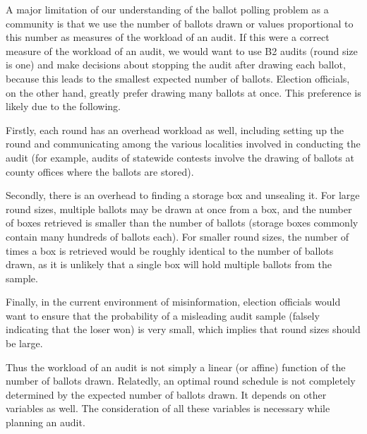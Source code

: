 A major limitation of our understanding of the ballot polling problem as a community is that we use the number of ballots drawn or values proportional to this number \cite{mclaughlin_thesis,bernhard-diss,RI-report} as measures of the workload of an audit. If this were a correct measure of the workload of an audit, we would want to use B2 audits (round size is one) and make decisions about stopping the audit after drawing each ballot, because this leads to the smallest expected number of ballots. Election officials, on the other hand, greatly prefer drawing many ballots at once. This preference is likely due to the following. 
\begin{description}
\item Firstly, each round has an overhead workload as well, including setting up the round and communicating among the various localities involved in conducting the audit (for example, audits of statewide contests involve the drawing of ballots at county offices where the ballots are stored). 
\item Secondly, there is an overhead to finding a storage box and unsealing it. For large round sizes, multiple ballots may be drawn at once from a box, and the number of boxes retrieved is smaller than the number of ballots (storage boxes commonly contain many hundreds of ballots each). For smaller round sizes, the number of times a box is retrieved would be roughly identical to the number of ballots drawn, as it is unlikely that a single box will hold multiple ballots from the sample. 
\item Finally, in the current environment of misinformation, election officials would want to ensure that the probability of a misleading audit sample (falsely indicating that the loser won) is very small, which implies that round sizes should be large. 
\end{description}
Thus the workload of an audit is not simply a linear (or affine) function of the number of ballots drawn. Relatedly, an optimal round schedule is not completely determined by the expected number of ballots drawn. It depends on other variables as well. The consideration of all these variables is necessary while planning an audit. 

